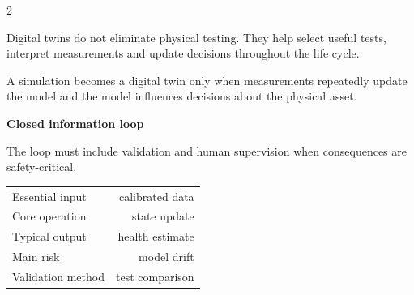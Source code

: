 \begin{multicols}{2}
\begin{ecarticle}
Digital twins do not eliminate physical testing. They help select useful tests, interpret measurements
and update decisions throughout the life cycle.
\end{ecarticle}

\begin{tcolorbox}[title=\sffamily\bfseries Engineering Insight,colback=yellow!10,colframe=ECOrange]
A simulation becomes a digital twin only when measurements repeatedly update the model and the model
influences decisions about the physical asset.
\end{tcolorbox}

\begin{engineeringfocus}
\textbf{Closed information loop}
\begin{center}
\end{center}
The loop must include validation and human supervision when consequences are safety-critical.
\end{engineeringfocus}

\begin{keyfigures}
\begin{tabularx}{\linewidth}{@{}Xr@{}}
Essential input & calibrated data\\
Core operation & state update\\
Typical output & health estimate\\
Main risk & model drift\\
Validation method & test comparison
\end{tabularx}
\end{keyfigures}


\end{multicols}
